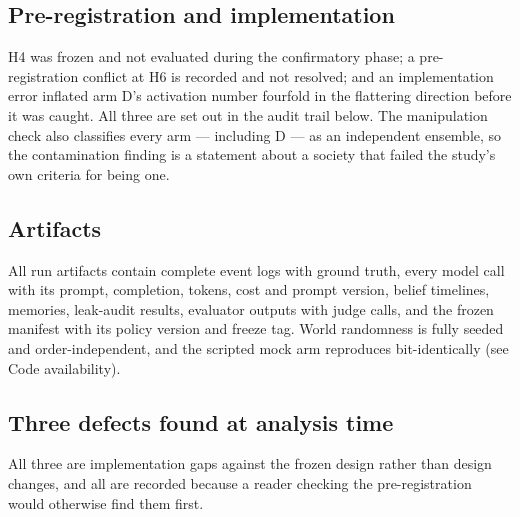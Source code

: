 \documentclass[pdflatex,sn-basic]{sn-jnl}
\begin{document}
\hypertarget{pre-registration-and-implementation}{%
\subsection{Pre-registration and implementation}\label{pre-registration-and-implementation}}

H4 was frozen and not evaluated during the
confirmatory phase; a pre-registration conflict at H6 is recorded and not resolved; and an
implementation error inflated arm D's activation number fourfold in the flattering
direction before it was caught. All three are set out in the audit trail below. The
manipulation check also classifies every arm --- including D --- as an independent ensemble,
so the contamination finding is a statement about a society that failed the study's own
criteria for being one.

\hypertarget{artifacts}{%
\subsection{Artifacts}\label{artifacts}}

All run artifacts contain complete event logs with ground truth, every
model call with its prompt, completion, tokens, cost and prompt version, belief timelines,
memories, leak-audit results, evaluator outputs with judge calls, and the frozen manifest
with its policy version and freeze tag. World randomness is fully seeded and order-independent, and the scripted mock arm
reproduces bit-identically (see Code availability).

\hypertarget{three-defects-found-at-analysis-time}{%
\subsection{Three defects found at analysis time}\label{three-defects-found-at-analysis-time}}

All three are implementation gaps against the frozen
design rather than design changes, and all are recorded because a reader checking the
pre-registration would otherwise find them first.
\end{document}

